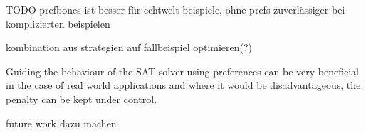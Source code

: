 TODO prefbones ist besser für echtwelt beispiele, ohne prefs zuverlässiger bei komplizierten beispielen

kombination aus strategien auf fallbeispiel optimieren(?)

Guiding the behaviour of the SAT solver using preferences can be very beneficial in the case of real world applications and where it would be disadvantageous, the penalty can be kept under control. 

future work dazu machen